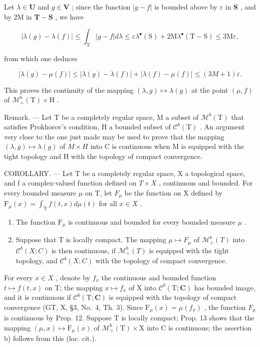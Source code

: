 Let \(\lambda \in \mathbf{U}\) and \(g\in \mathbf{V}\) ; since the function \(|g - f|\) is bounded above by \(\varepsilon\) in \(\mathbf{S}\) , and by 2M in \(\mathbf{T} - \mathbf{S}\) , we have

\[
\left| \lambda (g) - \lambda (f) \right| \leqslant \int_ {\mathrm{T}} | g - f | d \lambda \leqslant \varepsilon \lambda^ {\bullet} (\mathrm{S}) + 2 \mathrm{M} \lambda^ {\bullet} (\mathrm{T} - \mathrm{S}) \leqslant 3 \mathrm{M} \varepsilon ,
\]

from which one deduces

\[
\left| \lambda (g) - \mu (f) \right| \leqslant \left| \lambda (g) - \lambda (f) \right| + \left| \lambda (f) - \mu (f) \right| \leqslant (3 M + 1) \varepsilon .
\]

This proves the continuity of the mapping \((\lambda, g) \mapsto \lambda(g)\) at the point \((\mu, f)\) of \(\mathcal{M}_+^b(\mathrm{T}) \times \mathrm{H}\) .

Remark. --- Let T be a completely regular space, M a subset of \(\mathcal{M}^{b}(\mathrm{T})\) that satisfies Prokhorov's condition, H a bounded subset of \(\mathcal{C}^{b}(\mathrm{T})\) . An argument very close to the one just made may be used to prove that the mapping \((\lambda,g)\mapsto\lambda(g)\) of \(M\times H\) into C is continuous when M is equipped with the tight topology and H with the topology of compact convergence.

COROLLARY. --- Let T be a completely regular space, X a topological space, and f a complex-valued function defined on \(T \times X\) , continuous and bounded. For every bounded measure \(\mu\) on T, let \(F_{\mu}\) be the function on X defined by \(\mathrm{F}_{\mu}(x) = \int_{\mathrm{T}} f(t, x) d\mu(t)\) for all \(x \in X\) .

\begin{enumerate}
\def\labelenumi{\alph{enumi})}
\item
  The function \(\mathrm{F}_{\mu}\) is continuous and bounded for every bounded measure \(\mu\) .
\item
  Suppose that T is locally compact. The mapping \(\mu\mapsto F_{\mu}\) of \(\mathcal{M}_{+}^{b}(T)\) into \(\mathcal{C}^{b}(X;C)\) is then continuous, if \(\mathcal{M}_{+}^{b}(T)\) is equipped with the tight topology, and \(\mathcal{C}^{b}(X;C)\) with the topology of compact convergence.
\end{enumerate}

For every \(x \in X\) , denote by \(f_{x}\) the continuous and bounded function \(t \mapsto f(t, x)\) on T; the mapping \(x \mapsto f_{x}\) of X into \(\mathcal{C}^{b}(\mathrm{T}; \mathbf{C})\) has bounded image, and it is continuous if \(\mathcal{C}^{b}(\mathrm{T}; \mathbf{C})\) is equipped with the topology of compact convergence (GT, X, §3, No.~4, Th. 3). Since \(\mathrm{F}_{\mu}(x) = \mu(f_{x})\) , the function \(F_{\mu}\) is continuous by Prop. 12. Suppose T is locally compact; Prop. 13 shows that the mapping \((\mu, x) \mapsto \mathrm{F}_{\mu}(x)\) of \(\mathcal{M}_{+}^{b}(\mathrm{T}) \times \mathrm{X}\) into C is continuous; the assertion b) follows from this (loc. cit.).

